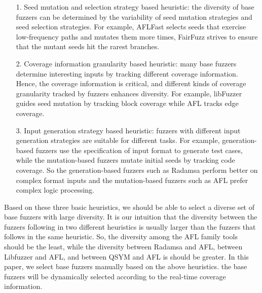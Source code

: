 \begin{itemize}

\item  [1.] Seed mutation and selection strategy based heuristic: the diversity of base fuzzers can be determined by the variability of seed mutation strategies and seed selection strategies. %
For example, AFLFast selects seeds that exercise low-frequency paths and mutates them more times, FairFuzz strives to ensure that the mutant seeds hit the rarest branches.

\item  [2.] Coverage information granularity based heuristic: many base fuzzers determine interesting inputs by tracking different coverage information. Hence, the coverage information is critical, and different kinds of coverage granularity tracked by fuzzers enhances diversity. For example, libFuzzer guides seed mutation by tracking block coverage while AFL tracks edge coverage.

\item  [3.] Input generation strategy based heuristic: fuzzers with different input generation strategies are suitable for different tasks. For example, generation-based fuzzers use the specification of input format to generate test cases, while the mutation-based fuzzers mutate initial seeds by tracking code coverage. So the generation-based fuzzers such as Radamsa perform better on complex format inputs and the mutation-based fuzzers such as AFL prefer complex logic processing.

\end{itemize}

Based on these three basic heuristics, we should be able to select a diverse set of base fuzzers with large diversity. It is our intuition that the diversity between the fuzzers following in two different heuristics is usually larger than the fuzzers that follows in the same heuristic. So, the diversity among the AFL family tools should be the least, while the diversity between Radamsa and AFL, between Libfuzzer and AFL, and between QSYM and AFL is should be greater. In this paper, we select base fuzzers manually based on the above heuristics. the base fuzzers will be dynamically selected according to the real-time coverage information.

